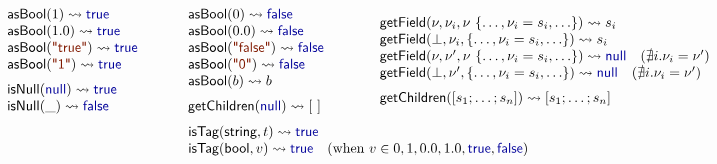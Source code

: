 \documentclass[preprint]{sigplanconf}
\newcommand{\kvd}[1]{\textnormal{\textcolor{kvdclr}{\sffamily #1}}}
\newcommand{\str}[1]{\textnormal{\textcolor{strclr}{\sffamily "#1"}}}
\newcommand{\ident}[1]{\textnormal{\sffamily #1}}
\newcommand{\reduce}{\rightsquigarrow}
\begin{document}
\begin{figure}
\begin{equation*}
\begin{array}{l}
\end{array}
\end{equation*}
%
\begin{equation*}
\hspace{-1.5em}
\begin{array}{l}
 \ident{asBool}(1) \reduce \kvd{true}\\
 \ident{asBool}(1.0) \reduce \kvd{true}\\
 \ident{asBool}(\str{true}) \reduce \kvd{true}\\
 \ident{asBool}(\str{1}) \reduce \kvd{true}
 \\[0.6em]
 \ident{isNull}(\kvd{null}) \reduce \kvd{true} \\
 \ident{isNull}(\_) \reduce \kvd{false} 
\end{array}
\hspace{2.6em}
\begin{array}{l}
 \ident{asBool}(0) \reduce \kvd{false}\\
 \ident{asBool}(0.0) \reduce \kvd{false}\\
 \ident{asBool}(\str{false}) \reduce \kvd{false}\\
 \ident{asBool}(\str{0}) \reduce \kvd{false}\\
 \ident{asBool}(b) \reduce b
 \\[0.6em]
 \ident{getChildren}(\kvd{null}) \reduce [~]
\end{array}
\hspace{3.0em}
\begin{array}{l}
 \ident{getField}(\nu,\nu_i, \nu~\{\ldots, \nu_i=s_i, \ldots\}) \reduce s_i\\
 \ident{getField}(\bot, \nu_i, \{\ldots, \nu_i=s_i, \ldots\}) \reduce s_i\\
 \ident{getField}(\nu,\nu', \nu~\{\ldots, \nu_i=s_i, \ldots\}) \reduce \kvd{null}\quad(\nexists i.\nu_i=\nu' )\\
 \ident{getField}(\bot, \nu', \{\ldots, \nu_i=s_i, \ldots\}) \reduce \kvd{null}\quad(\nexists i.\nu_i=\nu' )
 \\[0.6em]
 \ident{getChildren}([s_1; \ldots; s_n]) \reduce [s_1; \ldots; s_n]
\end{array}
\end{equation*}
%
\begin{equation*}
\hspace{-1.5em}
\begin{array}{l}
 \ident{isTag}(\ident{string}, t) \reduce \kvd{true} \\
 \ident{isTag}(\ident{bool}, v) \reduce \kvd{true} \quad(\textnormal{when}~v\in{0,1,0.0, 1.0, \kvd{true},\kvd{false}} )\\

\end{array}
\end{equation*}
\end{figure}
\end{document}
